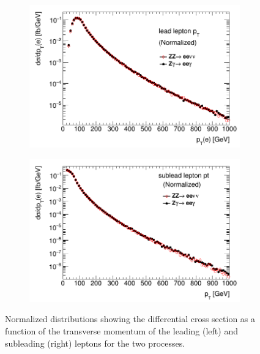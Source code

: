 \documentclass[11pt,a4paper,openright,twoside]{report}
\begin{document}
\begin{figure}[H]
\centering
	\begin{subfigure}{0.49\textwidth}
		\includegraphics[width=\linewidth]{leadpt.png}
		\caption{}
		\label{fig:leadpt}
	\end{subfigure}
	\begin{subfigure}{0.49\textwidth}
		\includegraphics[width=\linewidth]{subleadpt.png}
		\caption{}
		\label{fig:subleadpt}
	\end{subfigure}
	\caption{Normalized distributions showing the differential cross section as a function of the transverse momentum of the leading (left) and subleading (right) leptons for the two processes.}
	\label{fig:leppt}
\end{figure}
\end{document}
